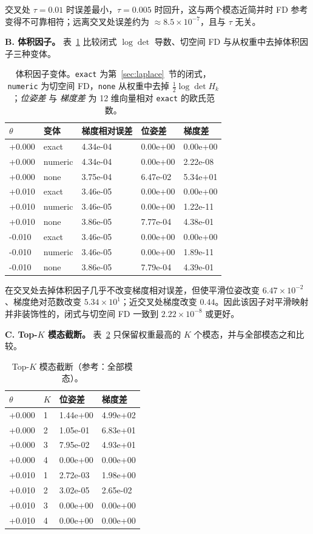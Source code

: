 交叉处 $\tau=0.01$ 时误差最小，$\tau=0.005$ 时回升，这与两个模态近简并时 FD 参考变得不可靠相符；远离交叉处误差约为 $\approx8.5\times10^{-7}$，且与 $\tau$ 无关。

\textbf{B. 体积因子。} 表~\ref{tab:volume} 比较闭式 $\log\det$ 导数、切空间 FD 与从权重中去掉体积因子三种变体。

\begin{table}[t]
\centering
\caption{体积因子变体。\texttt{exact} 为第~\ref{sec:laplace}~节的闭式，\texttt{numeric} 为切空间 FD，\texttt{none} 从权重中去掉 $\tfrac12\log\det H_k$；\emph{位姿差} 与 \emph{梯度差} 为 12 维向量相对 \texttt{exact} 的欧氏范数。}
\label{tab:volume}
\scriptsize
\setlength{\tabcolsep}{3pt}
\begin{tabular}{@{}l l l l l@{}}
\toprule
$\theta$ & 变体 & 梯度相对误差 & 位姿差 & 梯度差\\
\midrule
+0.000 & exact & 4.34e-04 & 0.00e+00 & 0.00e+00\\
+0.000 & numeric & 4.34e-04 & 0.00e+00 & 2.22e-08\\
+0.000 & none & 3.75e-04 & 6.47e-02 & 5.34e+01\\
+0.010 & exact & 3.46e-05 & 0.00e+00 & 0.00e+00\\
+0.010 & numeric & 3.46e-05 & 0.00e+00 & 1.22e-11\\
+0.010 & none & 3.86e-05 & 7.77e-04 & 4.38e-01\\
-0.010 & exact & 3.46e-05 & 0.00e+00 & 0.00e+00\\
-0.010 & numeric & 3.46e-05 & 0.00e+00 & 1.89e-11\\
-0.010 & none & 3.86e-05 & 7.79e-04 & 4.39e-01\\
\bottomrule
\end{tabular}
\end{table}

在交叉处去掉体积因子几乎不改变梯度相对误差，但使平滑位姿改变 $6.47\times10^{-2}$、梯度绝对范数改变 $5.34\times10^{1}$；近交叉处梯度改变 $0.44$。因此该因子对平滑映射并非装饰性的，闭式与切空间 FD 一致到 $2.22\times10^{-8}$ 或更好。

\textbf{C. Top-$K$ 模态截断。} 表~\ref{tab:topk} 只保留权重最高的 $K$ 个模态，并与全部模态之和比较。

\begin{table}[t]
\centering
\caption{Top-$K$ 模态截断（参考：全部模态）。}
\label{tab:topk}
\footnotesize
\setlength{\tabcolsep}{4pt}
\begin{tabular}{@{}l l l l@{}}
\toprule
$\theta$ & $K$ & 位姿差 & 梯度差\\
\midrule
+0.000 & 1 & 1.44e+00 & 4.99e+02\\
+0.000 & 2 & 1.05e-01 & 6.83e+01\\
+0.000 & 3 & 7.95e-02 & 4.93e+01\\
+0.000 & 4 & 0.00e+00 & 0.00e+00\\
+0.010 & 1 & 2.72e-03 & 1.98e+00\\
+0.010 & 2 & 3.02e-05 & 2.65e-02\\
+0.010 & 3 & 0.00e+00 & 0.00e+00\\
+0.010 & 4 & 0.00e+00 & 0.00e+00\\
\bottomrule
\end{tabular}
\end{table}

